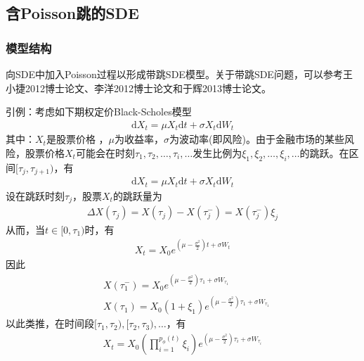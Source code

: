     \subsection{含Poisson跳的SDE}
        \subsubsection{模型结构}
            \label{subsubsec:模型结构}
            \par
            向SDE中加入Poisson过程以形成带跳SDE模型。关于带跳SDE问题，可以参考王小捷2012博士论文\cite{wang.2012}、李洋2012博士论文\cite{Li.2012}和于辉2013博士论文\cite{Yu.2013}。
            \par
            引例：考虑如下期权定价Black-Scholes模型
            \begin{align*}
                \mathrm{d}X_t = \mu X_t\mathrm{d}t + \sigma X_t\mathrm{d}W_t
            \end{align*}
            其中：$X_t$是股票价格 ，$\mu$为收益率，$\sigma$为波动率(即风险)。由于金融市场的某些风险，股票价格$X_t$可能会在时刻$\tau_1,\tau_2,\dots,\tau_i,\dots$发生比例为$\xi_1,\xi_2,\dots,\xi_i,\dots$的跳跃。在区间$[\tau_j,\tau_{j+1})$，有
            \begin{align*}
                \mathrm{d}X_t = \mu X_t \mathrm{d}t + \sigma X_t\mathrm{d}W_t
            \end{align*}
            设在跳跃时刻$\tau_j$，股票$X_t$的跳跃量为
            \begin{align*}
                \Delta X(\tau_j) = X(\tau_j) - X(\tau_j^-) = X(\tau_j^-)\xi_j
            \end{align*}
            从而，当$t\in [0,\tau_1)$时，有
            \begin{align*}
                X_t = X_0 e^{(\mu - \frac{\sigma^2}{2})t+\sigma W_t}
            \end{align*}
            因此
            \begin{align*}
                &X(\tau_1^-) = X_0 e^{(\mu - \frac{\sigma^2}{2})\tau_1+\sigma W_{\tau_1}}\\
                &X(\tau_1) = X_0(1+\xi_1) e^{(\mu - \frac{\sigma^2}{2})\tau_1+\sigma W_{\tau_1}}
            \end{align*}
            以此类推，在时间段$[\tau_1,\tau_2),[\tau_2,\tau_3),\dots$，有
            \begin{align*}
                X_t = X_0 \left( \prod_{i = 1}^{p_\phi(t)} \xi_i\right) e^{(\mu - \frac{\sigma^2}{2}){\tau_i}+\sigma W_{\tau_i}}
            \end{align*}
